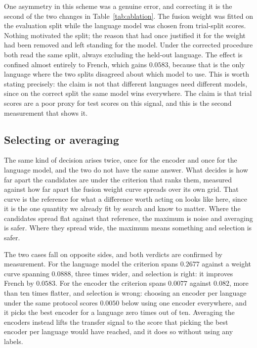 One asymmetry in this scheme was a genuine error, and correcting it is
the second of the two changes in Table~\ref{tab:ablation}. The fusion
weight was fitted on the evaluation split while the language model was
chosen from trial-split scores. Nothing motivated the split; the reason
that had once justified it for the weight had been removed and left
standing for the model. Under the corrected procedure both read the same
split, always excluding the held-out language. The effect is confined
almost entirely to French, which gains $0.0583$, because that is the
only language where the two splits disagreed about which model to use.
This is worth stating precisely: the claim is not that different
languages need different models, since on the correct split the same
model wins everywhere. The claim is that trial scores are a poor proxy
for test scores on this signal, and this is the second measurement that
shows it.

\subsection{Selecting or averaging}
\label{sec:selectavg}

The same kind of decision arises twice, once for the encoder and once
for the language model, and the two do not have the same answer. What
decides is how far apart the candidates are under the criterion that
ranks them, measured against how far apart the fusion weight curve
spreads over its own grid. That curve is the reference for what a
difference worth acting on looks like here, since it is the one
quantity we already fit by search and know to matter. Where the
candidates spread flat against that reference, the maximum is noise and
averaging is safer. Where they spread wide, the maximum means something
and selection is safer.

The two cases fall on opposite sides, and both verdicts are confirmed by
measurement. For the language model the criterion spans $0.2677$ against
a weight curve spanning $0.0888$, three times wider, and selection is
right: it improves French by $0.0583$. For the encoder the criterion
spans $0.0077$ against $0.082$, more than ten times flatter, and
selection is wrong: choosing an encoder per language under the same
protocol scores $0.0050$ below using one encoder everywhere, and it
picks the best encoder for a language zero times out of ten. Averaging the encoders instead lifts the transfer signal to the score
that picking the best encoder per language would have reached, and it
does so without using any labels.

